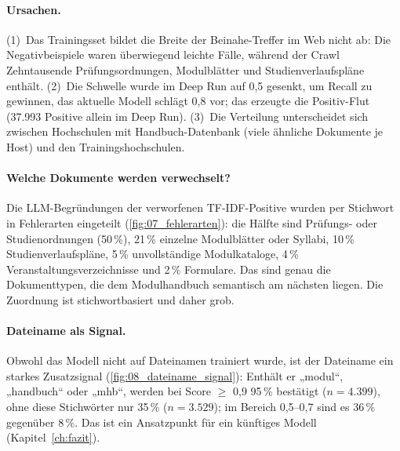 
\paragraph{Ursachen.} (1)~Das Trainingsset bildet die Breite der Beinahe-Treffer im Web nicht ab: Die Negativbeispiele waren überwiegend leichte Fälle, während der Crawl Zehntausende Prüfungsordnungen, Modulblätter und Studienverlaufspläne enthält. (2)~Die Schwelle wurde im Deep Run auf 0,5 gesenkt, um Recall zu gewinnen, das aktuelle Modell schlägt 0,8 vor; das erzeugte die Positiv-Flut (37.993 Positive allein im Deep Run). (3)~Die Verteilung unterscheidet sich zwischen Hochschulen mit Handbuch-Datenbank (viele ähnliche Dokumente je Host) und den Trainingshochschulen.

\paragraph{Welche Dokumente werden verwechselt?} Die LLM-Begründungen der \zFPTotal{} verworfenen TF-IDF-Positive wurden per Stichwort in Fehlerarten eingeteilt (\cref{fig:07_fehlerarten}): die Hälfte sind Prüfungs- oder Studienordnungen (50\,\%), 21\,\% einzelne Modulblätter oder Syllabi, 10\,\% Studienverlaufspläne, 5\,\% unvollständige Modulkataloge, 4\,\% Veranstaltungsverzeichnisse und 2\,\% Formulare. Das sind genau die Dokumenttypen, die dem Modulhandbuch semantisch am nächsten liegen. Die Zuordnung ist stichwortbasiert und daher grob.


\paragraph{Dateiname als Signal.} Obwohl das Modell nicht auf Dateinamen trainiert wurde, ist der Dateiname ein starkes Zusatzsignal (\cref{fig:08_dateiname_signal}): Enthält er „modul“, „handbuch“ oder „mhb“, werden bei Score $\ge$ 0,9 95\,\% bestätigt ($n=4.399$), ohne diese Stichwörter nur 35\,\% ($n=3.529$); im Bereich 0,5--0,7 sind es 36\,\% gegenüber 8\,\%. Das ist ein Ansatzpunkt für ein künftiges Modell (Kapitel~\ref{ch:fazit}).

